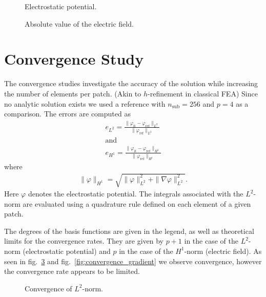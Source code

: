 \begin{center}
\begin{figure}[H]
  
  \caption{Electrostatic potential.}
  \label{fig:potential}
\end{figure}
\end{center}

\begin{center}
\begin{figure}[H]
  
  \caption{Absolute value of the electric field.}
  \label{fig:electric_field}
\end{figure}
\end{center}

\section{Convergence Study}
The convergence studies investigate the accuracy of the solution while increasing the number of elements per patch. (Akin to $h$-refinement in classical FEA) Since no analytic solution exists we used a reference with $n_\mathrm{sub}=256$ and $p=4$ as a comparison.
The errors are computed as
\begin{align}
  e_{L^2} = \frac{\| \varphi_\mathrm{it} - \varphi_\mathrm{ref} \|_{L^2}}{\| \varphi_\mathrm{ref} \|_{L^2}}\\
  \mathrm{and}\\
  e_{H^1} = \frac{\| \varphi_\mathrm{it} - \varphi_\mathrm{ref} \|_{H^1}}{\| \varphi_\mathrm{ref} \|_{H^1}}
\end{align}
where
\begin{align}
  \| \varphi \|_{H^1} = \sqrt{ \| \varphi \|_{L^2}^2 + \| \nabla\varphi \|_{L^2}^2 }.
\end{align}
Here $\varphi$ denotes the electrostatic potential. The integrals associated with the $L^2$-norm are evaluated using a quadrature rule defined on each element of a given patch.

The degrees of the basis functions are given in the legend, as well as theoretical limits for the convergence rates. They are given by $p+1$ in the case of the $L^2$-norm (electrostatic potential) and $p$ in the case of the $H^1$-norm (electric field). As seen in fig.~\ref{fig:convergence_potential} and fig.~\ref{fig:convergence_gradient} we observe convergence, however the convergence rate appears to be limited.

\begin{figure}[H]
  \begin{center}
    
    \caption{Convergence of $L^2$-norm.}
    \label{fig:convergence_potential}
  \end{center}
\end{figure}

